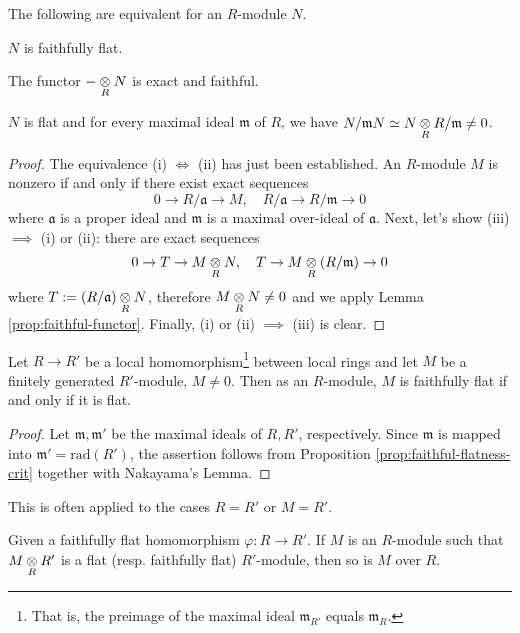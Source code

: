 \begin{proposition}\label{prop:faithful-flatness-crit}
	The following are equivalent for an $R$-module $N$.
	\begin{compactenum}[(i)]
		\item $N$ is faithfully flat.
		\item The functor $- \underset{R}{\otimes} N$ is exact and faithful.
		\item $N$ is flat and for every maximal ideal $\mathfrak{m}$ of $R$, we have $N/\mathfrak{m}N \simeq N \underset{R}{\otimes} R/\mathfrak{m} \neq 0$.
	\end{compactenum}
\end{proposition}
\begin{proof}
	The equivalence (i) $\iff$ (ii) has just been established. An $R$-module $M$ is nonzero if and only if there exist exact sequences
	\[ 0 \to R/\mathfrak{a} \to M, \quad R/\mathfrak{a} \to R/\mathfrak{m} \to 0 \]
	where $\mathfrak{a}$ is a proper ideal and $\mathfrak{m}$ is a maximal over-ideal of $\mathfrak{a}$. Next, let's show (iii) $\implies$ (i) or (ii): there are exact sequences
	\[ 0 \to T \to M \underset{R}{\otimes} N, \quad T \to M \underset{R}{\otimes} (R/\mathfrak{m}) \to 0 \]
	where $T := (R/\mathfrak{a}) \underset{R}{\otimes} N$, therefore $M \underset{R}{\otimes} N \neq 0$ and we apply Lemma \ref{prop:faithful-functor}. Finally, (i) or (ii) $\implies$ (iii) is clear.
\end{proof}

\begin{corollary}
	Let $R \to R'$ be a local homomorphism\footnote{That is, the preimage of the maximal ideal $\mathfrak{m}_{R'}$ equals $\mathfrak{m}_R$.} between local rings and let $M$ be a finitely generated $R'$-module, $M \neq 0$. Then as an $R$-module, $M$ is faithfully flat if and only if it is flat.
\end{corollary}
\begin{proof}
	Let $\mathfrak{m}, \mathfrak{m}'$ be the maximal ideals of $R, R'$, respectively. Since $\mathfrak{m}$ is mapped into $\mathfrak{m}' = \text{rad}(R')$, the assertion follows from Proposition \ref{prop:faithful-flatness-crit} together with Nakayama's Lemma.
\end{proof}

This is often applied to the cases $R=R'$ or $M=R'$.

\begin{exercise}
	Given a faithfully flat homomorphism $\varphi: R \to R'$. If $M$ is an $R$-module such that $M \underset{R}{\otimes} R'$ is a flat (resp. faithfully flat) $R'$-module, then so is $M$ over $R$.
\end{exercise}


